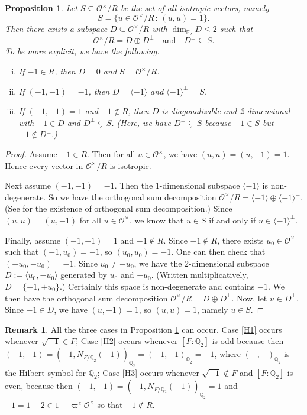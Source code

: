 \documentclass[10pt, letterpaper]{amsart}
\theoremstyle{plain}
\newtheorem{Prop}[equation]{Proposition}
\theoremstyle{definition}
\newtheorem*{Rmk}{Remark}
\numberwithin{equation}{section}
\newcommand{\F}{\mathbb{F}}
\newcommand{\Q}{\mathbb{Q}}
\newcommand{\Ocal}{\mathcal{O}}
\newcommand{\la}{\langle}
\newcommand{\ra}{\rangle}
\newcommand{\st}{\,:\,}
\newcommand{\qand}{{\quad\text{and}\quad}}
\begin{document}
\begin{Prop}\label{P:orthogonal_decomposition_of_Hilbert}
Let $S\subseteq \Ocal^\times\slash R$ be the set of all isotropic vectors, namely
\[
S=\{u\in\Ocal^\times\slash R\st (u, u)=1\}.
\]
Then there exists a subspace $D\subseteq \Ocal^\times\slash R$ with $\dim_{\F_2}D\leq 2$ such that
\[
\Ocal^\times\slash R=D\oplus D^\perp\qand D^\perp\subseteq S.
\]
To be more explicit, we have the following.
\begin{enumerate}[(i)]
\item If $-1\in R$, then $D=0$ and $S=\Ocal^\times\slash R$.\label{H1}
\item If $(-1, -1)=-1$, then $D=\la-1\ra$ and $\la-1\ra^{\perp}=S$. \label{H2}
\item If $(-1, -1)=1$ and $-1\notin R$, then $D$ is diagonalizable and 2-dimensional with $-1\in D$ and $D^\perp\subsetneq S$. (Here, we have $D^\perp\subsetneq S$ because $-1\in S$ but $-1\notin D^\perp$.) \label{H3}
\end{enumerate}
\end{Prop}
\begin{proof}
Assume $-1\in R$. Then for all $u\in\Ocal^\times$, we have $(u, u)=(u, -1)=1$. Hence every vector in $\Ocal^\times\slash R$ is isotropic. 

Next assume $(-1, -1)=-1$. Then the 1-dimensional subspace $\la-1\ra$ is non-degenerate. So we have the orthogonal sum decomposition $\Ocal^\times\slash R=\la-1\ra\oplus \la-1\ra^\perp$. (See \cite[Proposition 1.1.1]{Kitaoka} for the existence of orthogonal sum decomposition.) Since $(u, u)=(u, -1)$ for all $u\in\Ocal^\times$, we know that $u\in S$ if and only if $u\in \la-1\ra^\perp$.

Finally, assume $(-1, -1)=1$ and $-1\notin R$. Since $-1\notin R$, there exists $u_0\in\Ocal^\times$ such that $(-1, u_0)=-1$, so $(u_0, u_0)=-1$. One can then check that $(-u_0, -u_0)=-1$. Since $u_0\neq -u_0$, we have the 2-dimensional subspace $D:=\la u_0, -u_0\ra$ generated by $u_0$ and $-u_0$. (Written multiplicatively, $D=\{\pm 1, \pm u_0\}$.) Certainly this space is non-degenerate and contains $-1$. We then have the orthogonal sum decomposition $\Ocal^\times\slash R=D\oplus D^\perp$. Now, let $u\in D^\perp$. Since $-1\in D$, we have $(u, -1)=1$, so $(u, u)=1$, namely $u\in S$. 
\end{proof}

\begin{Rmk}
All the three cases in Proposition \ref{P:orthogonal_decomposition_of_Hilbert} can occur. Case \eqref{H1} occurs whenever $\sqrt{-1}\in F$; Case \eqref{H2} occurs whenever $[F:\Q_{2}]$ is odd because then $(-1, -1)=(-1, N_{F\slash\Q_2}(-1))_{\Q_2}=(-1, -1)_{\Q_2}=-1$, where $(-, -)_{\Q_2}$ is the Hilbert symbol for $\Q_2$; Case \eqref{H3} occurs whenever $\sqrt{-1}\notin F$ and $[F:\Q_{2}]$ is even, because then $(-1, -1)=(-1, N_{F\slash\Q_2}(-1))_{\Q_2}=1$ and $-1=1-2\in 1+\varpi^e\Ocal^\times$ so that $-1\notin R$.
\end{Rmk}
\end{document}
